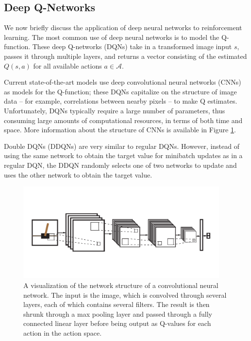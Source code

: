 \documentclass[11pt]{article}
\begin{document}
\subsection{Deep Q-Networks}

We now briefly discuss the application of deep neural networks to reinforcement learning. The most common use of deep neural networks is to model the Q-function. These deep Q-networks (DQNs) take in a transformed image input $s$, passes it through multiple layers, and returns a vector consisting of the estimated $Q(s, a)$ for all available actions $a \in \mathcal{A}$. 

Current state-of-the-art models \cite{mnih2013playing, mnih2015human} use deep convolutional neural networks (CNNs) as models for the Q-function; these DQNs capitalize on the structure of image data -- for example, correlations between nearby pixels -- to make Q estimates. Unfortunately, DQNs typically require a large number of parameters, thus consuming large amounts of computational resources, in terms of both time and space. More information about the structure of CNNs is available in Figure \ref{fig:cnn}.

Double DQNs (DDQNs) \cite{van2016deep} are very similar to regular DQNs. However, instead of using the same network to obtain the target value for minibatch updates as in a regular DQN, the DDQN randomly selects one of two networks to update and uses the other network to obtain the target value.

\begin{figure}
    \centering
    \includegraphics[trim={0 1cm 0 1cm}, clip, width=0.95\textwidth]{cnn.pdf}
    \caption{A visualization of the network structure of a convolutional neural network. The input is the image, which is convolved through several layers, each of which contains several filters. The result is then shrunk through a max pooling layer and passed through a fully connected linear layer before being output as Q-values for each action in the action space.}
    \label{fig:cnn}
\end{figure}
\end{document}
